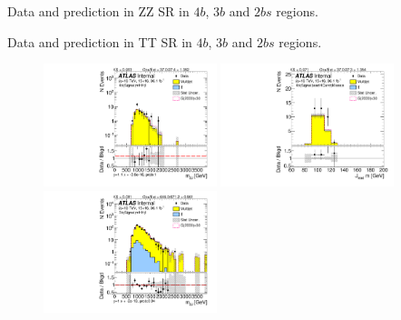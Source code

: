\begin{table}[htbp!]
\caption{Data and prediction in ZZ SR in $4b$, $3b$ and $2bs$ regions.}
\begin{center}

\end{center}
\label{CRSB:DataPred_ZZSR}
\end{table}

\begin{table}[htbp!]
\begin{center}
\caption{Data and prediction in TT SR in $4b$, $3b$ and $2bs$ regions.}

\end{center}
\label{CRSB:DataPred_TTSR}
\end{table}

\begin{figure}[htbp!]
\begin{center}
\includegraphics[width=0.45\textwidth,angle=-90]{figures/boosted/ZZ/Moriond_ZZ_FourTag_Signal_mHH_l_1.pdf}
\includegraphics[width=0.45\textwidth,angle=-90]{figures/boosted/ZZ/Moriond_ZZ_FourTag_Signal_leadHCand_Mass_s.pdf}\\
\includegraphics[width=0.45\textwidth,angle=-90]{figures/boosted/ZZ/Moriond_ZZ_ThreeTag_Signal_mHH_l_1.pdf}

\end{center}
\end{figure}
